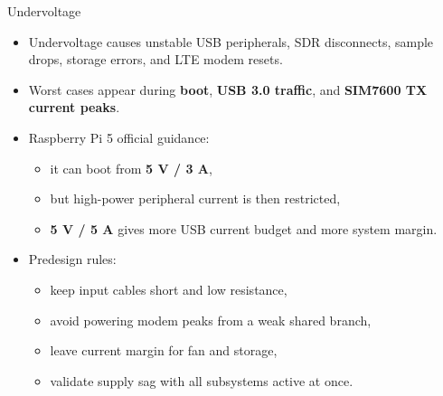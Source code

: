 \documentclass{beamer}
\begin{document}
\begin{frame}{Undervoltage}
    \small
    \begin{itemize}
        \item Undervoltage causes unstable USB peripherals, SDR disconnects, sample drops, storage errors, and LTE modem resets.
        \item Worst cases appear during \textbf{boot}, \textbf{USB 3.0 traffic}, and \textbf{SIM7600 TX current peaks}.
        \item Raspberry Pi 5 official guidance:
        \begin{itemize}
            \item it can boot from \textbf{5 V / 3 A},
            \item but high-power peripheral current is then restricted,
            \item \textbf{5 V / 5 A} gives more USB current budget and more system margin.
        \end{itemize}
        \item Predesign rules:
        \begin{itemize}
            \item keep input cables short and low resistance,
            \item avoid powering modem peaks from a weak shared branch,
            \item leave current margin for fan and storage,
            \item validate supply sag with all subsystems active at once.
        \end{itemize}
    \end{itemize}
\end{frame}
\end{document}
